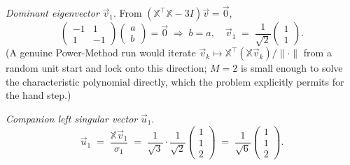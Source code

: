 \documentclass[12pt,a4paper]{article}
\begin{document}
\emph{Dominant eigenvector} $\vec v_1$. From $(\mathbb{X}^\top\mathbb{X} - 3I)\vec v = \vec 0$,
\[
\begin{pmatrix} -1 & 1 \\ 1 & -1 \end{pmatrix}\begin{pmatrix} a \\ b \end{pmatrix} = \vec 0 \;\Longrightarrow\; b = a, \quad \vec v_1 \;=\; \frac{1}{\sqrt{2}}\begin{pmatrix} 1 \\ 1 \end{pmatrix}.
\]
(A genuine Power-Method run would iterate $\vec v_k \mapsto \mathbb{X}^\top(\mathbb{X}\vec v_k)/\lVert\cdot\rVert$ from a random unit start and lock onto this direction; $M=2$ is small enough to solve the characteristic polynomial directly, which the problem explicitly permits for the hand step.)

\emph{Companion left singular vector} $\vec u_1$.
\[
\vec u_1 \;=\; \frac{\mathbb{X}\vec v_1}{\sigma_1} \;=\; \frac{1}{\sqrt{3}}\cdot\frac{1}{\sqrt{2}}\begin{pmatrix} 1 \\ 1 \\ 2 \end{pmatrix} \;=\; \frac{1}{\sqrt{6}}\begin{pmatrix} 1 \\ 1 \\ 2 \end{pmatrix}.
\]
\end{document}

